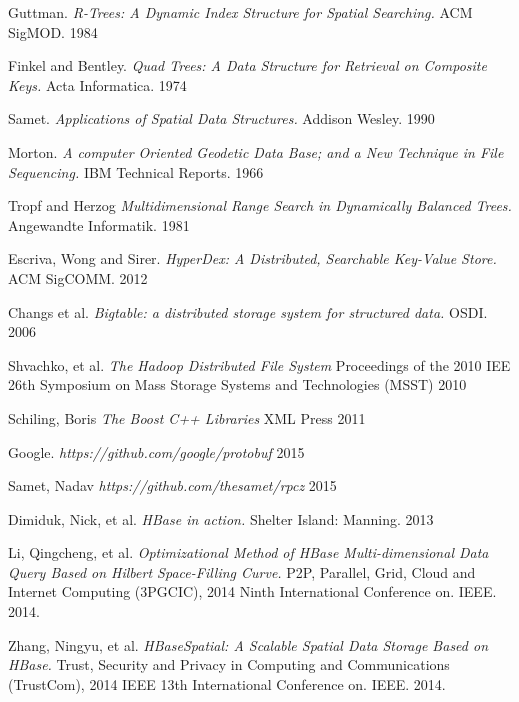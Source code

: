 \documentclass[11pt]{article}
\begin{document}
\raggedright

\begin{thebibliography}{99}

  Guttman.
  \emph{R-Trees: A Dynamic Index Structure for Spatial Searching.}
  ACM SigMOD.
  1984

  Finkel and Bentley.
  \emph{Quad Trees: A Data Structure for Retrieval on Composite Keys.}
  Acta Informatica.
  1974

  Samet.
  \emph{Applications of Spatial Data Structures.}
  Addison Wesley.
  1990

  Morton.
  \emph{A computer Oriented Geodetic Data Base; and a New Technique in File Sequencing.}
  IBM Technical Reports. 
  1966

 Tropf and Herzog
 \emph{Multidimensional Range Search in Dynamically Balanced Trees.}
 Angewandte Informatik.
 1981

  Escriva, Wong and Sirer.
  \emph{HyperDex: A Distributed, Searchable Key-Value Store.}
  ACM SigCOMM.
  2012

  Changs et al.
  \emph{Bigtable: a distributed storage system for structured data.}
  OSDI.
  2006

Shvachko, et al.
\emph{The Hadoop Distributed File System}
Proceedings of the 2010 IEE 26th Symposium on Mass Storage Systems and Technologies (MSST)
2010

Schiling, Boris
\emph{The Boost C++ Libraries}
XML Press
2011

Google.
\emph{https://github.com/google/protobuf}
2015

Samet, Nadav
\emph{https://github.com/thesamet/rpcz}
2015

  Dimiduk, Nick, et al.
  \emph{HBase in action.}
   Shelter Island: Manning.
   2013

  Li, Qingcheng, et al.
  \emph{Optimizational Method of HBase Multi-dimensional Data Query Based on Hilbert Space-Filling Curve.}
   P2P, Parallel, Grid, Cloud and Internet Computing (3PGCIC), 2014 Ninth International Conference on. IEEE.
   2014.

  Zhang, Ningyu, et al. 
  \emph{HBaseSpatial: A Scalable Spatial Data Storage Based on HBase.}
   Trust, Security and Privacy in Computing and Communications (TrustCom), 2014 IEEE 13th International Conference on. IEEE.
   2014. 
   

\end{thebibliography}
\end{document}
